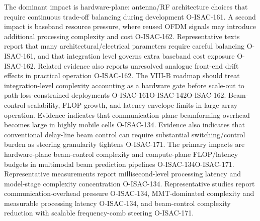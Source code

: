  The dominant impact is hardware-plane: antenna/RF architecture choices that require continuous trade-off balancing during development O-ISAC-161. A second impact is baseband resource pressure, where reused OFDM signals may introduce additional processing complexity and cost O-ISAC-162.\markdownRendererOlItemEnd 
{} Representative texts report that many architectural/electrical parameters require careful balancing O-ISAC-161, and that integration level governs extra baseband cost exposure O-ISAC-162. Related evidence also reports unresolved analogue front-end drift effects in practical operation O-ISAC-162.\markdownRendererOlItemEnd 
{} The VIII-B roadmap should treat integration-level complexity accounting as a hardware gate before scale-out to path-loss-constrained deployments O-ISAC-161O-ISAC-142O-ISAC-162.\markdownRendererOlItemEnd 
\markdownRendererOlEnd \markdownRendererInterblockSeparator
{}
\markdownRendererSectionEnd \markdownRendererSectionBegin
{}\markdownRendererInterblockSeparator
{}\markdownRendererOlBegin
{} Beam-control scalability, FLOP growth, and latency envelope limits in large-array operation.\markdownRendererOlItemEnd 
{} Evidence indicates that communication-plane beamforming overhead becomes large in highly mobile cells O-ISAC-134. Evidence also indicates that conventional delay-line beam control can require substantial switching/control burden as steering granularity tightens O-ISAC-171.\markdownRendererOlItemEnd 
{} The primary impacts are hardware-plane beam-control complexity and compute-plane FLOP/latency budgets in multimodal beam prediction pipelines O-ISAC-134O-ISAC-171. Representative measurements report millisecond-level processing latency and model-stage complexity concentration O-ISAC-134.\markdownRendererOlItemEnd 
{} Representative studies report communication-overhead pressure O-ISAC-134, MMT-dominated complexity and measurable processing latency O-ISAC-134, and beam-control complexity reduction with scalable frequency-comb steering O-ISAC-171.\markdownRendererOlItemEnd 
